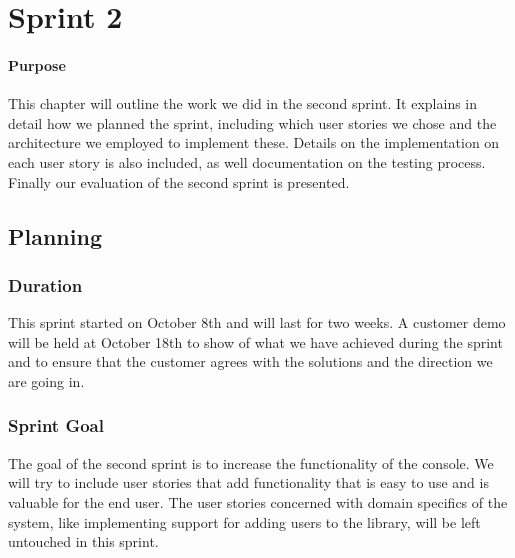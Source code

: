 \chapter{Sprint 2}

\minitoc

\subsubsection{Purpose}

This chapter will outline the work we did in the second sprint. It explains in detail how we planned the sprint, including which user stories we chose and the architecture we employed to implement these. Details on the implementation on each user story is also included, as well documentation on the testing process. Finally our evaluation of the second sprint is presented. 

\clearpage

\section{Planning}

\subsection{Duration}
This sprint started on October 8th and will last for two weeks. A customer demo will be held at October 18th to show of what we have achieved during the sprint and to ensure that the customer agrees with the solutions and the direction we are going in.

\subsection{Sprint Goal}
The goal of the second sprint is to increase the functionality of the console. We will try to include user stories that add functionality that is easy to use and is valuable for the end user. The user stories concerned with domain specifics of the system, like implementing support for adding users to the library, will be left untouched in this sprint.

